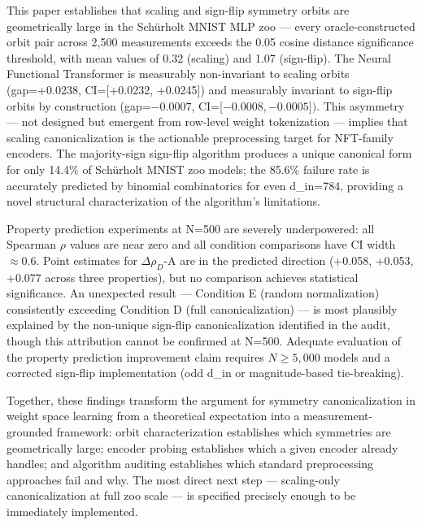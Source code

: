 
This paper establishes that scaling and sign-flip symmetry orbits are geometrically large in the Schürholt MNIST MLP zoo --- every oracle-constructed orbit pair across 2,500 measurements exceeds the 0.05 cosine distance significance threshold, with mean values of 0.32 (scaling) and 1.07 (sign-flip). The Neural Functional Transformer is measurably non-invariant to scaling orbits (gap=+0.0238, CI=[+0.0232, +0.0245]) and measurably invariant to sign-flip orbits by construction (gap=$-0.0007$, CI=[$-0.0008, -0.0005])$. This asymmetry --- not designed but emergent from row-level weight tokenization --- implies that scaling canonicalization is the actionable preprocessing target for NFT-family encoders. The majority-sign sign-flip algorithm produces a unique canonical form for only 14.4\% of Schürholt MNIST zoo models; the 85.6\% failure rate is accurately predicted by binomial combinatorics for even d\_in=784, providing a novel structural characterization of the algorithm's limitations.

Property prediction experiments at N=500 are severely underpowered: all Spearman $\rho$ values are near zero and all condition comparisons have CI width $\approx 0.6$. Point estimates for $\Delta\rho_{D}$-A are in the predicted direction (+0.058, +0.053, +0.077 across three properties), but no comparison achieves statistical significance. An unexpected result --- Condition E (random normalization) consistently exceeding Condition D (full canonicalization) --- is most plausibly explained by the non-unique sign-flip canonicalization identified in the audit, though this attribution cannot be confirmed at N=500. Adequate evaluation of the property prediction improvement claim requires $N\geq 5,000$ models and a corrected sign-flip implementation (odd d\_in or magnitude-based tie-breaking).

Together, these findings transform the argument for symmetry canonicalization in weight space learning from a theoretical expectation into a measurement-grounded framework: orbit characterization establishes which symmetries are geometrically large; encoder probing establishes which a given encoder already handles; and algorithm auditing establishes which standard preprocessing approaches fail and why. The most direct next step --- scaling-only canonicalization at full zoo scale --- is specified precisely enough to be immediately implemented.

